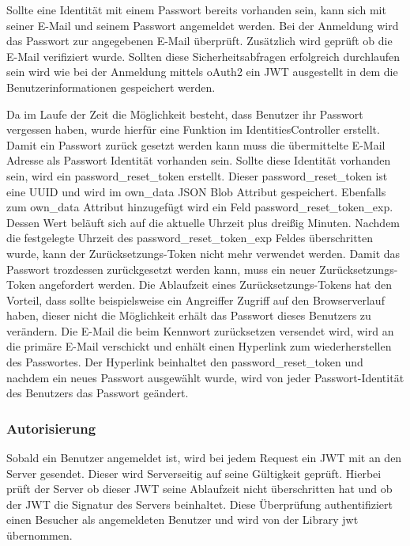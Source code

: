 \begin{description}
	Sollte eine Identität mit einem Passwort bereits vorhanden sein, kann sich mit seiner E-Mail und seinem Passwort angemeldet werden. Bei der Anmeldung wird das Passwort zur angegebenen E-Mail überprüft. Zusätzlich wird geprüft ob die E-Mail verifiziert wurde. Sollten diese Sicherheitsabfragen erfolgreich durchlaufen sein wird wie bei der Anmeldung mittels \gls{oAuth2} ein \gls{JWT} ausgestellt in dem die Benutzerinformationen gespeichert werden.

	Da im Laufe der Zeit die Möglichkeit besteht, dass Benutzer ihr Passwort vergessen haben, wurde hierfür eine Funktion im IdentitiesController erstellt. Damit ein Passwort zurück gesetzt werden kann muss die übermittelte E-Mail Adresse als Passwort Identität vorhanden sein. Sollte diese Identität vorhanden sein, wird ein password\_reset\_token erstellt. Dieser password\_reset\_token ist eine \gls{UUID} und wird im own\_data JSON Blob Attribut gespeichert. Ebenfalls zum own\_data Attribut hinzugefügt wird ein Feld password\_reset\_token\_exp. Dessen Wert beläuft sich auf die aktuelle Uhrzeit plus dreißig Minuten. Nachdem die festgelegte Uhrzeit des password\_reset\_token\_exp Feldes überschritten wurde, kann der Zurücksetzungs-Token nicht mehr verwendet werden. Damit das Passwort trozdessen zurückgesetzt werden kann, muss ein neuer Zurücksetzungs-Token angefordert werden. Die Ablaufzeit eines Zurücksetzungs-Tokens hat den Vorteil, dass sollte beispielsweise ein Angreiffer Zugriff auf den Browserverlauf haben, dieser nicht die Möglichkeit erhält das Passwort dieses Benutzers zu verändern. Die E-Mail die beim Kennwort zurücksetzen versendet wird, wird an die primäre E-Mail verschickt und enhält einen Hyperlink zum wiederherstellen des Passwortes. Der Hyperlink beinhaltet den password\_reset\_token und nachdem ein neues Passwort ausgewählt wurde, wird von jeder Passwort-Identität des Benutzers das Passwort geändert.
\end{description}

\subsubsection{Autorisierung}
\label{sec:server-authorisation}
Sobald ein Benutzer angemeldet ist, wird bei jedem Request ein \gls{JWT} mit an den Server gesendet. Dieser wird Serverseitig auf seine Gültigkeit geprüft. Hierbei prüft der Server ob dieser \gls{JWT} seine Ablaufzeit nicht überschritten hat und ob der \gls{JWT} die Signatur des Servers beinhaltet. Diese Überprüfung authentifiziert einen Besucher als angemeldeten Benutzer und wird von der Library jwt übernommen.


